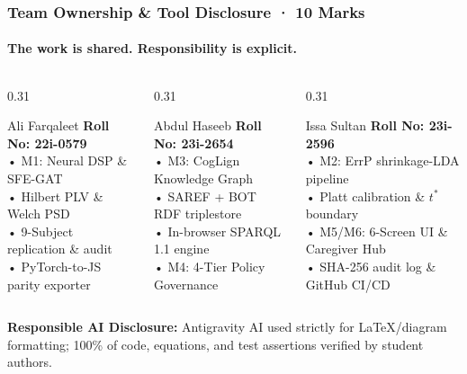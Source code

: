 \documentclass[aspectratio=169,10pt]{beamer}
\begin{document}
\begin{frame}
    \frametitle{Team Ownership & Tool Disclosure · 10 Marks}
    \framesubtitle{The work is shared. Responsibility is explicit.}
    \begin{columns}[T]
        \begin{column}{0.31\textwidth}
            \begin{block}{\small Ali Farqaleet}
                \scriptsize
                \textbf{Roll No: 22i-0579}\\
                • M1: Neural DSP \& SFE-GAT\\
                • Hilbert PLV \& Welch PSD\\
                • 9-Subject replication \& audit\\
                • PyTorch-to-JS parity exporter
            \end{block}
        \end{column}
        \begin{column}{0.31\textwidth}
            \begin{block}{\small Abdul Haseeb}
                \scriptsize
                \textbf{Roll No: 23i-2654}\\
                • M3: CogLign Knowledge Graph\\
                • SAREF + BOT RDF triplestore\\
                • In-browser SPARQL 1.1 engine\\
                • M4: 4-Tier Policy Governance
            \end{block}
        \end{column}
        \begin{column}{0.31\textwidth}
            \begin{block}{\small Issa Sultan}
                \scriptsize
                \textbf{Roll No: 23i-2596}\\
                • M2: ErrP shrinkage-LDA pipeline\\
                • Platt calibration \& $t^*$ boundary\\
                • M5/M6: 6-Screen UI \& Caregiver Hub\\
                • SHA-256 audit log \& GitHub CI/CD
            \end{block}
        \end{column}
    \end{columns}
    \vspace{0.2cm}
    {\scriptsize \textbf{\color{ForestGreen}Responsible AI Disclosure:} Antigravity AI used strictly for LaTeX/diagram formatting; 100\% of code, equations, and test assertions verified by student authors.}
\end{frame}
\end{document}
